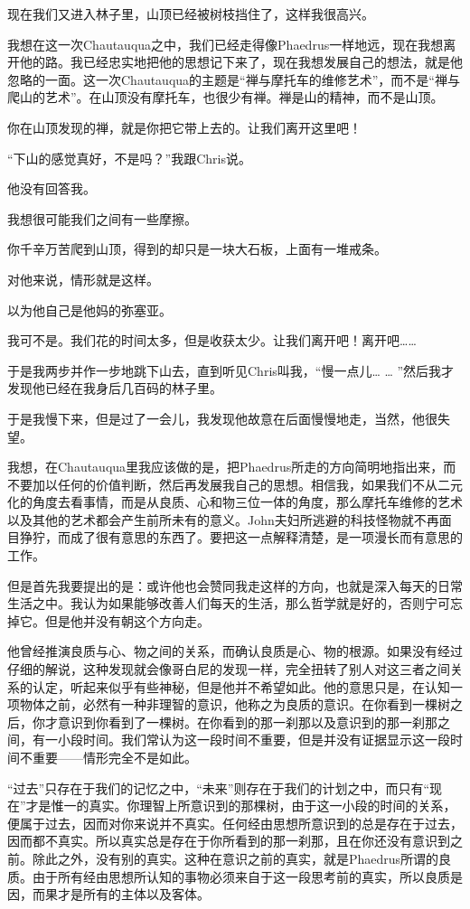 \documentclass[UTF8]{article}
\begin{document}
\par 现在我们又进入林子里，山顶已经被树枝挡住了，这样我很高兴。
\par 我想在这一次Chautauqua之中，我们已经走得像Phaedrus一样地远，现在我想离开他的路。我已经忠实地把他的思想记下来了，现在我想发展自己的想法，就是他忽略的一面。这一次Chautauqua的主题是“禅与摩托车的维修艺术”，而不是“禅与爬山的艺术”。在山顶没有摩托车，也很少有禅。禅是山的精神，而不是山顶。
\par 你在山顶发现的禅，就是你把它带上去的。让我们离开这里吧！
\par “下山的感觉真好，不是吗？”我跟Chris说。
\par 他没有回答我。
\par 我想很可能我们之间有一些摩擦。
\par 你千辛万苦爬到山顶，得到的却只是一块大石板，上面有一堆戒条。
\par 对他来说，情形就是这样。
\par 以为他自己是他妈的弥塞亚。
\par 我可不是。我们花的时间太多，但是收获太少。让我们离开吧！离开吧……
\par 于是我两步并作一步地跳下山去，直到听见Chris叫我，“慢一点儿… … ”然后我才发现他已经在我身后几百码的林子里。
\par 于是我慢下来，但是过了一会儿，我发现他故意在后面慢慢地走，当然，他很失望。
\par 我想，在Chautauqua里我应该做的是，把Phaedrus所走的方向简明地指出来，而不要加以任何的价值判断，然后再发展我自己的思想。相信我，如果我们不从二元化的角度去看事情，而是从良质、心和物三位一体的角度，那么摩托车维修的艺术以及其他的艺术都会产生前所未有的意义。John夫妇所逃避的科技怪物就不再面目狰狞，而成了很有意思的东西了。要把这一点解释清楚，是一项漫长而有意思的工作。
\par 但是首先我要提出的是：或许他也会赞同我走这样的方向，也就是深入每天的日常生活之中。我认为如果能够改善人们每天的生活，那么哲学就是好的，否则宁可忘掉它。但是他并没有朝这个方向走。
\par 他曾经推演良质与心、物之间的关系，而确认良质是心、物的根源。如果没有经过仔细的解说，这种发现就会像哥白尼的发现一样，完全扭转了别人对这三者之间关系的认定，听起来似乎有些神秘，但是他并不希望如此。他的意思只是，在认知一项物体之前，必然有一种非理智的意识，他称之为良质的意识。在你看到一棵树之后，你才意识到你看到了一棵树。在你看到的那一刹那以及意识到的那一刹那之间，有一小段时间。我们常认为这一段时间不重要，但是并没有证据显示这一段时间不重要——情形完全不是如此。
\par “过去”只存在于我们的记忆之中，“未来”则存在于我们的计划之中，而只有“现在”才是惟一的真实。你理智上所意识到的那棵树，由于这一小段的时间的关系，便属于过去，因而对你来说并不真实。任何经由思想所意识到的总是存在于过去，因而都不真实。所以真实总是存在于你所看到的那一刹那，且在你还没有意识到之前。除此之外，没有别的真实。这种在意识之前的真实，就是Phaedrus所谓的良质。由于所有经由思想所认知的事物必须来自于这一段思考前的真实，所以良质是因，而果才是所有的主体以及客体。
\end{document}

